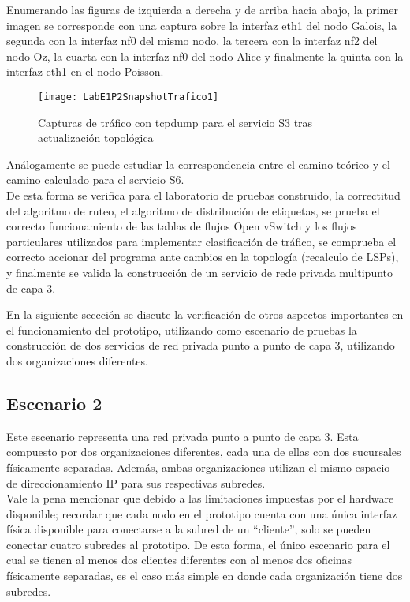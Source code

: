 Enumerando las figuras de izquierda a derecha y de arriba hacia abajo, la primer imagen se corresponde con una captura sobre la interfaz eth1 del nodo Galois, la segunda con la interfaz nf0 del mismo nodo, la tercera con la interfaz nf2 del nodo Oz, la cuarta con la interfaz nf0 del nodo Alice y finalmente la quinta con la interfaz eth1 en el nodo Poisson.

\newpage
\begin{figure}[ht!] 
\centering    
\texttt{[image: LabE1P2SnapshotTrafico1]}
\caption[Capturas de tr\'afico con tcpdump para el servicio S3 tras actualización topol\'ogica]{Capturas de tr\'afico con tcpdump para el servicio S3 tras actualización topol\'ogica}
\label{fig:LabE1P1CapsTraf3}
\end{figure}

Análogamente se puede estudiar la correspondencia entre el camino te\'orico y el camino calculado para el servicio S6.\\
 
De esta forma se verifica para el laboratorio de pruebas construido, la correctitud del algoritmo de ruteo, el algoritmo de distribución de etiquetas, se prueba el correcto funcionamiento de las tablas de flujos Open vSwitch y los flujos particulares utilizados para implementar clasificación de tr\'afico, se comprueba el correcto accionar del programa ante cambios en la topolog\'ia (recalculo de LSPs), y finalmente se valida la construcción de un servicio de rede privada multipunto de capa 3.

En la siguiente seccci\'on se discute la verificación de otros aspectos importantes en el funcionamiento del prototipo, utilizando como escenario de pruebas la construcci\'on de dos servicios de red privada punto a punto de capa 3, utilizando dos organizaciones diferentes.   

\subsection{Escenario 2}

Este escenario representa una red privada punto a punto de capa 3. Esta compuesto por dos organizaciones diferentes, cada una de ellas con dos sucursales f\'isicamente separadas. Adem\'as, ambas organizaciones utilizan el mismo espacio de direccionamiento IP para sus respectivas subredes.\\

Vale la pena mencionar que debido a las limitaciones impuestas por el hardware disponible; recordar que cada nodo en el prototipo cuenta con una \'unica interfaz f\'isica disponible para conectarse a la subred de un “cliente”, solo se pueden conectar cuatro subredes al prototipo. De esta forma, el \'unico  escenario para el cual se tienen al menos dos clientes diferentes con al menos dos oficinas físicamente separadas, es el caso m\'as simple en donde cada organización tiene dos subredes. 

